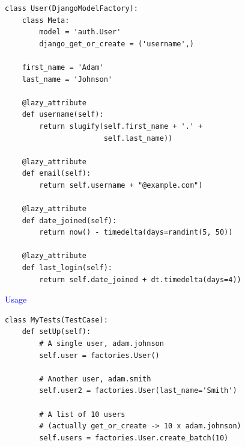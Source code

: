 \documentclass[landscape]{slides}
\begin{document}
\begin{slide}
    \begin{lstlisting}
class User(DjangoModelFactory):
    class Meta:
        model = 'auth.User'
        django_get_or_create = ('username',)

    first_name = 'Adam'
    last_name = 'Johnson'

    @lazy_attribute
    def username(self):
        return slugify(self.first_name + '.' +
                       self.last_name))

    @lazy_attribute
    def email(self):
        return self.username + "@example.com")

    @lazy_attribute
    def date_joined(self):
        return now() - timedelta(days=randint(5, 50))

    @lazy_attribute
    def last_login(self):
        return self.date_joined + dt.timedelta(days=4))
    \end{lstlisting}

\end{slide}


\begin{slide}
    \textcolor{blue}{\Large{Usage}}

    \begin{lstlisting}
class MyTests(TestCase):
    def setUp(self):
        # A single user, adam.johnson
        self.user = factories.User()

        # Another user, adam.smith
        self.user2 = factories.User(last_name='Smith')

        # A list of 10 users
        # (actually get_or_create -> 10 x adam.johnson)
        self.users = factories.User.create_batch(10)
    \end{lstlisting}

\end{slide}
\end{document}
